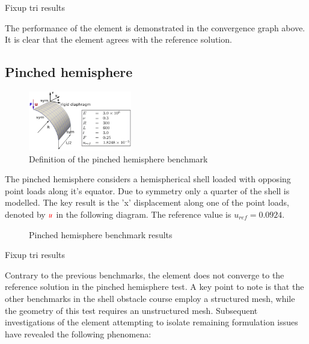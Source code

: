 \doublespacing

Fixup tri results

The performance of the element is demonstrated in the convergence graph above. It is clear that the element agrees with the reference solution.

\subsection{Pinched hemisphere}

\begin{figure}
	\centering
	\includegraphics[width=0.4\textwidth]{images/pinchedcylinder.png}
	\caption{Definition of the pinched hemisphere benchmark \cite{Bou13}}
\end{figure}

The pinched hemisphere considers a hemispherical shell loaded with opposing point loads along it's equator. Due to symmetry only a quarter of the shell is modelled. The key result is the 'x' displacement along one of the point loads, denoted by $\textcolor{red}{u}$ in the following diagram. The reference value is $u_{ref} =  0.0924$. 

\singlespacing
\begin{figure}[H]
	\caption{\label{ref_label_overall}Pinched hemisphere benchmark results}
\end{figure}

\doublespacing

Fixup tri results

Contrary to the previous benchmarks, the element does not converge to the reference solution in the pinched hemisphere test.  A key point to note is that the other benchmarks in the shell obstacle course employ a structured mesh, while the geometry of this test requires an unstructured mesh. Subsequent investigations of the element attempting to isolate remaining formulation issues have revealed the following phenomena:

